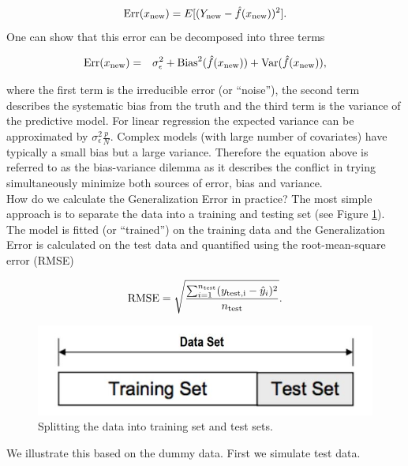 \documentclass[
]{book}
\newenvironment{Shaded}{\begin{snugshade}}{\end{snugshade}}
\newcommand{\AttributeTok}[1]{\textcolor[rgb]{0.77,0.63,0.00}{#1}}
\newcommand{\CommentTok}[1]{\textcolor[rgb]{0.56,0.35,0.01}{\textit{#1}}}
\newcommand{\FloatTok}[1]{\textcolor[rgb]{0.00,0.00,0.81}{#1}}
\newcommand{\FunctionTok}[1]{\textcolor[rgb]{0.00,0.00,0.00}{#1}}
\newcommand{\NormalTok}[1]{#1}
\newcommand{\OtherTok}[1]{\textcolor[rgb]{0.56,0.35,0.01}{#1}}
\newcommand{\SpecialCharTok}[1]{\textcolor[rgb]{0.00,0.00,0.00}{#1}}
\begin{document}
\[{\rm Err}(x_{\rm new})=E[(Y_{\rm new}-\hat{f}(x_{\rm new}))^2].\]
One can show that this error can be decomposed into three terms

\begin{eqnarray}
{\rm Err}(x_{\rm new})&=&\sigma_{\epsilon}^2+{\rm Bias}^2(\hat{f}(x_{\rm new})) + {\rm Var}(\hat{f}(x_{\rm new})),
\end{eqnarray}

where the first term is the irreducible error (or ``noise''), the second term describes the systematic bias from the truth and the third term is the variance of the predictive model. For linear regression the expected variance can be approximated by \(\sigma^2_{\epsilon} \frac{p}{N}\). Complex models (with large number of covariates) have typically a small bias but a large variance. Therefore the equation above is referred to as the bias-variance dilemma as it describes the conflict in trying simultaneously minimize both sources of error, bias and variance.\\

How do we calculate the Generalization Error in practice? The most simple approach is to separate the data into a training and testing set (see Figure \ref{fig:traintest}). The model is fitted (or ``trained'') on the training data and the Generalization Error is calculated on the test data and quantified using the root-mean-square error (RMSE)

\[ {\rm RMSE}= \sqrt{\frac{\sum_{i=1}^{n_{\rm test}}(y_{\rm test,i}-\hat y_{i})^2}{n_{\rm test}}}.\]

\begin{figure}

{\centering \includegraphics[width=0.8\linewidth]{traintest} 

}

\caption{Splitting the data into training set and test sets.}\label{fig:traintest}
\end{figure}

We illustrate this based on the dummy data. First we simulate test data.

\begin{Shaded}
\end{Shaded}
\end{document}
